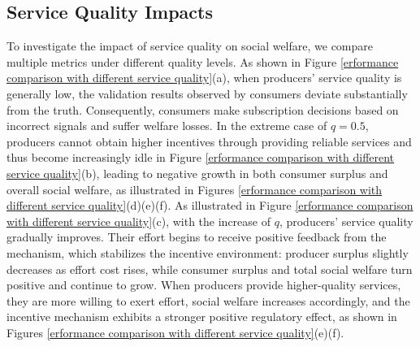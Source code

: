 \vspace{-3mm}
\subsection{Service Quality Impacts}

To investigate the impact of service quality on social welfare, we compare multiple metrics under different quality levels. As shown in Figure \ref{erformance comparison with different service quality}(a), when producers’ service quality is generally low, the validation results observed by consumers deviate substantially from the truth. Consequently, consumers make subscription decisions based on incorrect signals and suffer welfare losses. In the extreme case of $q=0.5$, producers cannot obtain higher incentives through providing reliable services and thus become increasingly idle in Figure \ref{erformance comparison with different service quality}(b), leading to negative growth in both consumer surplus and overall social welfare, as illustrated in Figures \ref{erformance comparison with different service quality}(d)(e)(f).
As illustrated in Figure \ref{erformance comparison with different service quality}(c), with the increase of $q$, producers’ service quality gradually improves. Their effort begins to receive positive feedback from the mechanism, which stabilizes the incentive environment: producer surplus slightly decreases as effort cost rises, while consumer surplus and total social welfare turn positive and continue to grow. When producers provide higher-quality services, they are more willing to exert effort, social welfare increases accordingly, and the incentive mechanism exhibits a stronger positive regulatory effect, as shown in Figures \ref{erformance comparison with different service quality}(e)(f).
